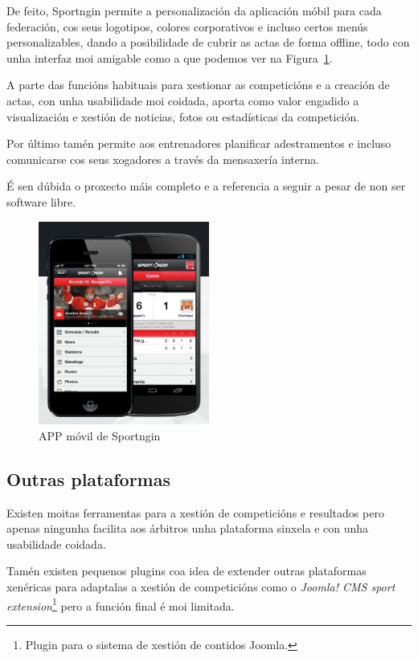     De feito, Sportngin permite a personalización da aplicación móbil para 
cada federación, cos seus logotipos, colores corporativos e incluso certos 
menús personalizables, dando a posibilidade de cubrir as actas de forma 
offline, todo con unha interfaz moi amigable como a que podemos ver na 
Figura~\ref{fig:img:sportngin}.

    A parte das funcións habituais para xestionar as competicións e a creación 
de actas, con unha usabilidade moi coidada, aporta como valor engadido a 
visualización e xestión de noticias, fotos ou estadísticas da competición.

    Por último tamén permite aos entrenadores planificar adestramentos e incluso 
comunicarse cos seus xogadores a través da mensaxería interna.

    É sen dúbida o proxecto máis completo e a referencia a seguir a pesar de 
non ser software libre.
 
    \begin{figure}[h!]
      \begin{center}
	\includegraphics[width=0.5\textwidth]{./img/sportngin-app.png}
	\caption{APP móvil de Sportngin}
	\label{fig:img:sportngin}
      \end{center}
    \end{figure}

    \subsection{Outras plataformas}
    Existen moitas ferramentas para a xestión de competicións e resultados pero apenas 
ningunha facilita aos árbitros unha plataforma sinxela e con unha 
usabilidade coidada.

    Tamén existen pequenos plugins coa idea de extender outras plataformas 
xenéricas para adaptalas a xestión de competicións como o \emph{Joomla! CMS 
sport extension}\footnote{Plugin para o sistema de xestión de contidos Joomla.} 
pero a función final é moi limitada.

